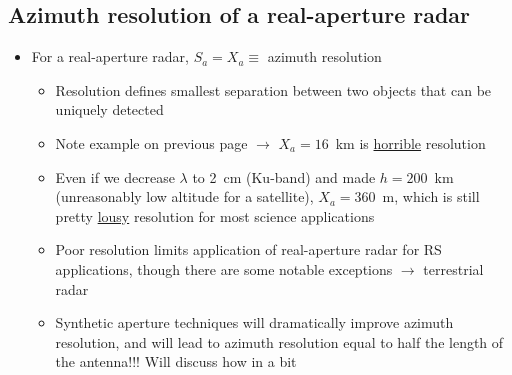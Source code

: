 \documentclass[11pt, oneside]{article}
\begin{document}
\subsection{Azimuth resolution of a real-aperture radar}
\label{s:rar}

\begin{itemize}
	\item For a real-aperture radar, $S_a = X_a \equiv$ azimuth resolution
	\begin{itemize}
		\item[--] Resolution defines smallest separation between two objects that can be uniquely detected
		\item[--] Note example on previous page $\rightarrow$ $X_a = 16$~km is \underline{horrible} resolution
		\item[--] Even if we decrease $\lambda$ to 2~cm (Ku-band) and made $h = 200$~km (unreasonably low altitude for a satellite), $X_a = 360$~m, which is still pretty \underline{lousy} resolution for most science applications
		\item[--] Poor resolution limits application of real-aperture radar for RS applications, though there are some notable exceptions $\rightarrow$ terrestrial radar
		\item[--] Synthetic aperture techniques will dramatically improve azimuth resolution, and will lead to azimuth resolution equal to half the length of the antenna!!! Will discuss how in a bit
	\end{itemize}
\end{itemize}
\end{document}
